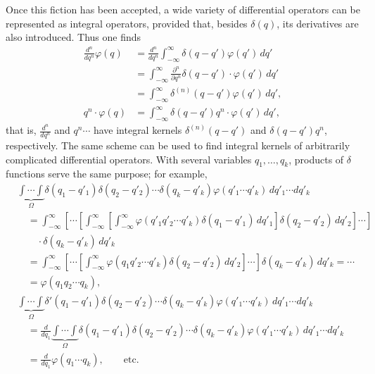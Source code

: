 \documentclass[fontsize=13pt,twoside,openany,headings=normal,parskip=false,bookmarkpackage=false,DIV=calc]{scrbook}
\begin{document}
Once this fiction has been accepted, a wide variety of differential operators can be represented as integral operators, provided that, besides $\delta(q)$, its derivatives are also introduced. Thus one finds
\begin{align*}
 \frac{d^n}{dq^n}\varphi(q)
 &=\frac{d^n}{dq^n}\int_{-\infty}^{\infty}\delta(q-q')\varphi(q')\,dq'\\
 &=\int_{-\infty}^{\infty}\frac{\partial^n}{\partial q^n}\delta(q-q')
    \cdot\varphi(q')\,dq'\\
 &=\int_{-\infty}^{\infty}\delta^{(n)}(q-q')\varphi(q')\,dq',\\
 q^n\cdot\varphi(q)&=\int_{-\infty}^{\infty}\delta(q-q')q^n\cdot\varphi(q')\,dq',
\end{align*}
that is, $\frac{d^n}{dq^n}$ and $q^n\cdots$ have integral kernels $\delta^{(n)}(q-q')$ and $\delta(q-q')q^n$, respectively. The same scheme can be used to find integral kernels of arbitrarily complicated differential operators. With several variables $q_1,\ldots,q_k$, products of $\delta$ functions serve the same purpose; for example,
\begin{align*}
 &\underbrace{\int\cdots\int}_{\Omega}\delta(q_1-q'_1)\delta(q_2-q'_2)\cdots
 \delta(q_k-q'_k)\varphi(q'_1\cdots q'_k)\,dq'_1\cdots dq'_k\\
 &\quad=\int_{-\infty}^{\infty}\left[\cdots
 \left[\int_{-\infty}^{\infty}
 \left[\int_{-\infty}^{\infty}\varphi(q'_1q'_2\cdots q'_k)
 \delta(q_1-q'_1)\,dq'_1\right]
 \delta(q_2-q'_2)\,dq'_2\right]\cdots\right]\\
 &\qquad{}\cdot\delta(q_k-q'_k)\,dq'_k\\
 &\quad=\int_{-\infty}^{\infty}\left[\cdots
 \left[\int_{-\infty}^{\infty}\varphi(q_1q'_2\cdots q'_k)
 \delta(q_2-q'_2)\,dq'_2\right]\cdots\right]
 \delta(q_k-q'_k)\,dq'_k=\cdots\\
 &\quad=\varphi(q_1q_2\cdots q_k),\\[1ex]
 &\underbrace{\int\cdots\int}_{\Omega}\delta'(q_1-q'_1)\delta(q_2-q'_2)\cdots
 \delta(q_k-q'_k)\varphi(q'_1\cdots q'_k)\,dq'_1\cdots dq'_k\\
 &\quad=\frac{d}{dq_1}\underbrace{\int\cdots\int}_{\Omega}
 \delta(q_1-q'_1)\delta(q_2-q'_2)\cdots\delta(q_k-q'_k)
 \varphi(q'_1\cdots q'_k)\,dq'_1\cdots dq'_k\\
 &\quad=\frac{d}{dq_1}\varphi(q_1\cdots q_k),\qquad\text{etc.}
\end{align*}
\hypertarget{origpage-15}{}%
\end{document}
